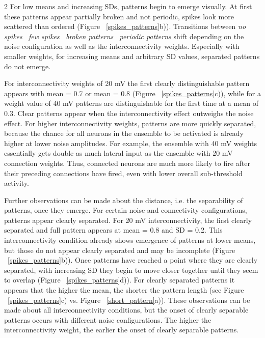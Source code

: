 \documentclass[12pt,a4paper]{article}
\begin{document}
\begin{multicols}{2}
            For low means and increasing SDs, patterns begin to emerge visually. At first these patterns appear partially broken and not periodic, spikes look more scattered than ordered (Figure ~\ref{spikes_patterns}b)). Transitions between \textit{no spikes \textrightarrow\ few spikes \textrightarrow\ broken patterns \textrightarrow\ periodic patterns} shift depending on the noise configuration as well as the interconnectivity weights. Especially with smaller weights, for increasing means and arbitrary SD values, separated patterns do not emerge.
            
            For interconnectivity weights of 20 mV the first clearly distinguishable pattern appears with mean = 0.7 or mean = 0.8 (Figure ~\ref{spikes_patterns}c)),  while for a weight value of 40 mV patterns are distinguishable for the first time at a mean of 0.3. Clear patterns appear when the interconnectivity effect outweighs the noise effect. For higher interconnectivity weights, patterns are more quickly separated, because the chance for all neurons in the ensemble to be activated is already higher at lower noise amplitudes. For example, the ensemble with 40 mV weights essentially gets double as much lateral input as the ensemble with 20 mV connection weights. Thus, connected neurons are much more likely to fire after their preceding connections have fired, even with lower overall sub-threshold activity.
            
            Further observations can be made about the distance, i.e. the separability of patterns, once they emerge. For certain noise and connectivity configurations, patterns appear clearly separated. For 20 mV interconnectivity, the first clearly separated and full pattern appears at mean = 0.8 and SD = 0.2. This interconnectivity condition already shows emergence of patterns at lower means, but those do not appear clearly separated and may be incomplete (Figure ~\ref{spikes_patterns}b)). Once patterns have reached a point where they are clearly separated, with increasing SD they begin to move closer together until they seem to overlap (Figure ~\ref{spikes_patterns}d)). For clearly separated patterns it appears that the higher the mean, the shorter the pattern length (see Figure ~\ref{spikes_patterns}c) vs. Figure ~\ref{short_pattern}a)). These observations can be made about all interconnectivity conditions, but the onset of clearly separable patterns occurs with different noise configurations. The higher the interconnectivity weight, the earlier the onset of clearly separable patterns.


\end{multicols}
\end{document}
